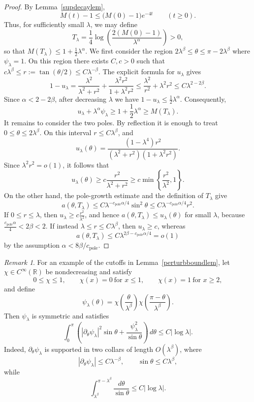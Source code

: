 \documentclass[11pt,a4paper]{article}
\numberwithin{equation}{section}
\theoremstyle{plain}
\theoremstyle{remark}
\newtheorem{remark}[theorem]{Remark}
\begin{document}
\begin{proof}
By Lemma~\ref{supdecaylem},
$$
M(t)-1
\leq
\bigl(M(0)-1\bigr)e^{-4t}
\qquad
(t\geq0).
$$
Thus, for sufficiently small $\lambda$, we may define
$$
T_\lambda
=
\frac14
\log\left(\frac{2(M(0)-1)}{\lambda^\alpha}\right)>0,
$$
so that $M(T_\lambda)\leq1+\frac12\lambda^\alpha$. We first consider the region $2\lambda^\beta\leq\theta\leq\pi-2\lambda^\beta$ where $\psi_\lambda=1$. On this region there exists $C,c>0$ such that $c\lambda^\beta\leq r:=\tan(\theta/2)\leq C\lambda^{-\beta}$. The explicit
formula for $u_\lambda$ gives
$$
1-u_\lambda
=
\frac{\lambda^2}{\lambda^2+r^2}
+
\frac{\lambda^2r^2}{1+\lambda^2r^2}
\leq
\frac{\lambda^2}{r^2}+\lambda^2r^2
\leq
C\lambda^{2-2\beta}.
$$
Since $\alpha<2-2\beta$, after decreasing $\lambda$ we have $1-u_\lambda\leq\frac12\lambda^\alpha$. Consequently,
$$
u_\lambda+\lambda^\alpha\psi_\lambda
\geq
1+\frac12\lambda^\alpha
\geq
M(T_\lambda).
$$
It remains to consider the two poles. By reflection it is
enough to treat $0\leq\theta\leq2\lambda^\beta$. On this interval
$r\leq C\lambda^\beta$, and
$$
u_\lambda(\theta)
=
\frac{(1-\lambda^4)r^2}
     {(\lambda^2+r^2)(1+\lambda^2r^2)}.
$$
Since $\lambda^2r^2=o(1)$, it follows that
$$
u_\lambda(\theta)
\geq
c\frac{r^2}{\lambda^2+r^2}
\geq
c\min\left\{\frac{r^2}{\lambda^2},1\right\}.
$$
On the other hand, the pole-growth estimate and the definition of
$T_\lambda$ give
$$
a(\theta,T_\lambda)
\leq
C\lambda^{-c_{\mathrm{pole}}\alpha/4}\sin^2\theta
\leq
C\lambda^{-c_{\mathrm{pole}}\alpha/4}r^2.
$$
If $0\leq r\leq\lambda$, then $u_\lambda\geq c\frac{r^2}{\lambda^2}$, and hence $a(\theta,T_\lambda)\leq u_\lambda(\theta)$ for small
$\lambda$, because $\frac{c_{\mathrm{pole}}\alpha}{4}<2\beta<2$. If instead $\lambda\leq r\leq C\lambda^\beta$, then
$u_\lambda\geq c$, whereas
$$
a(\theta,T_\lambda)
\leq
C\lambda^{2\beta-c_{\mathrm{pole}}\alpha/4}
=o(1)
$$
by the assumption $\alpha<8\beta/c_{\mathrm{pole}}$. 
\end{proof}

\begin{remark}\label{perturbationcutoff}
For an example of the cutoffs in Lemma~\ref{perturbboundlem}, let
$\chi\in C^\infty(\mathbb R)$ be nondecreasing and satisfy
$$
0\leq\chi\leq1,
\qquad
\chi(x)=0\ \text{for }x\leq1,
\qquad
\chi(x)=1\ \text{for }x\geq2,
$$
and define
$$
\psi_\lambda(\theta)
=
\chi\!\left(\frac{\theta}{\lambda^\beta}\right)
\chi\!\left(\frac{\pi-\theta}{\lambda^\beta}\right).
$$
Then $\psi_\lambda$ is symmetric and satisfies
$$
\int_0^\pi
\left(
|\partial_\theta\psi_\lambda|^2\sin\theta
+
\frac{\psi_\lambda^2}{\sin\theta}
\right)\,d\theta
\leq
C|\log\lambda|.
$$
Indeed, $\partial_\theta\psi_\lambda$ is supported in two collars of
length $O(\lambda^\beta)$, where
$$
|\partial_\theta\psi_\lambda|
\leq
C\lambda^{-\beta},
\qquad
\sin\theta\leq C\lambda^\beta,
$$
while
$$
\int_{\lambda^\beta}^{\pi-\lambda^\beta}
\frac{d\theta}{\sin\theta}
\leq
C|\log\lambda|.
$$
\end{remark}
\end{document}
